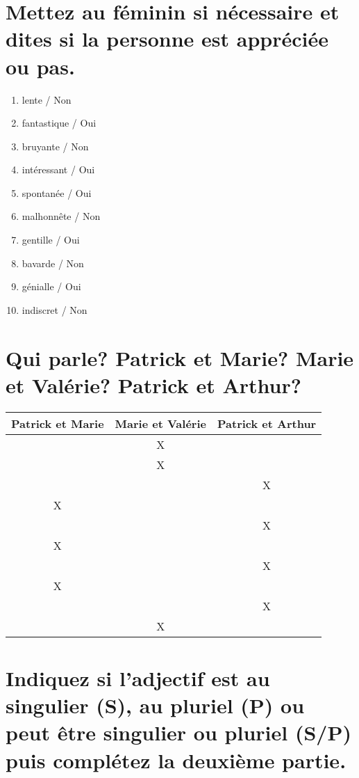 \section{Mettez au féminin si nécessaire et dites si la personne est appréciée ou pas.}

\begin{enumerate}
    \item lente / Non 
    \item fantastique / Oui
    \item bruyante / Non
    \item intéressant / Oui
    \item spontanée / Oui
    \item malhonnête / Non
    \item gentille / Oui
    \item bavarde / Non
    \item génialle / Oui 
    \item indiscret / Non
\end{enumerate}

\section{Qui parle? Patrick et Marie? Marie et Valérie? Patrick et Arthur?}

\begin{tabular}{|c|c|c|}
    \hline
    Patrick et Marie & Marie et Valérie & Patrick et Arthur \\
    \hline
    & X & \\
    \hline
    & X & \\
    \hline
    & & X \\
    \hline
    X & & \\
    \hline
    & & X \\
    \hline
    X & & \\
    \hline
    & & X \\
    \hline
    X & & \\
    \hline
    & & X \\
    \hline
    & X & \\
    \hline
\end{tabular}

\section{Indiquez si l'adjectif est au singulier (S), au pluriel (P) ou peut être singulier ou pluriel (S/P) puis complétez la deuxième partie.}

